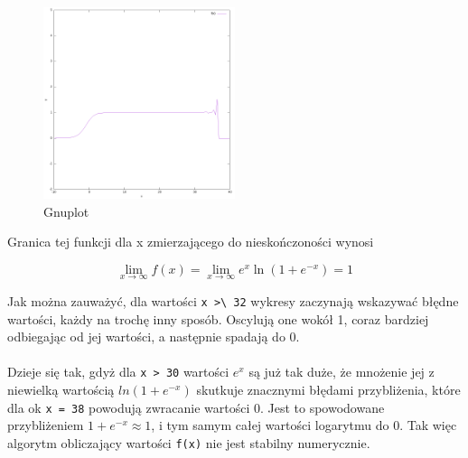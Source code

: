 \documentclass[15pt, a4paper]{article}
\begin{document}
\begin{figure}[h]
    \centering
    \includegraphics[width=0.5\textwidth]{img/gnuplot1.png}
    \caption{Gnuplot}
\end{figure}

\vspace{0.5cm}

\noindent Granica tej funkcji dla x zmierzającego do nieskończoności wynosi 

\[
\lim_{x \to \infty} f(x) = \lim_{x \to \infty} e^x \ln(1 + e^{-x}) = 1
\]

\noindent Jak można zauważyć, dla wartości \verb|x >\ 32| wykresy zaczynają wskazywać błędne wartości, każdy na trochę inny sposób. Oscylują one wokół 1, coraz bardziej odbiegając od jej wartości, a następnie spadają do 0. \\\\

\noindent Dzieje się tak, gdyż dla \verb|x > 30| wartości $e^{x}$ są już tak duże, że mnożenie jej z niewielką wartością $ln(1 + e^{-x})$ skutkuje znacznymi błędami przybliżenia, które dla ok \verb|x = 38| powodują zwracanie wartości 0. Jest to spowodowane przybliżeniem $1 + e^{-x} \approx 1$, i tym samym całej wartości logarytmu do 0. Tak więc algorytm obliczający wartości \verb|f(x)| nie jest stabilny numerycznie.

\vspace{0.5cm}

\noindent\hrulefill


\vspace{0.5cm}
\end{document}
